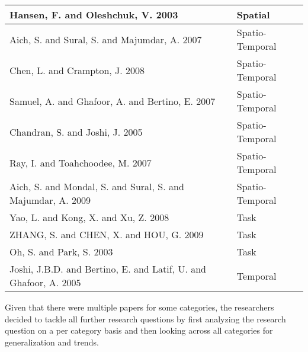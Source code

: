 \begin{center}
\begin{tabular}{|p{10cm}|p{3cm}|}
Hansen, F. and Oleshchuk, V. 2003 \cite{hansen2003spatial} & Spatial \\\hline
Aich, S. and Sural, S. and Majumdar, A. 2007 \cite{aich07:STARBAC} & Spatio-Temporal \\\hline
Chen, L. and Crampton, J. 2008 \cite{chen08:spatio-temporal} & Spatio-Temporal \\\hline
Samuel, A. and Ghafoor, A. and Bertino, E. 2007 \cite{samuel07:spatio-temporal} & Spatio-Temporal \\\hline
Chandran, S. and Joshi, J. 2005 \cite{chandran05:llt} & Spatio-Temporal \\\hline
Ray, I. and Toahchoodee, M. 2007 \cite{ray07:spatio} & Spatio-Temporal \\\hline
Aich, S. and Mondal, S. and Sural, S. and Majumdar, A. 2009 \cite{aich09:role} & Spatio-Temporal \\\hline
Yao, L. and Kong, X. and Xu, Z. 2008 \cite{yao2008task} & Task \\\hline
ZHANG, S. and CHEN, X. and HOU, G. 2009 \cite{zhou2007team} & Task \\\hline
Oh, S. and Park, S. 2003 \cite{oh2003task} & Task \\\hline
Joshi, J.B.D. and Bertino, E. and Latif, U. and Ghafoor, A. 2005 \cite{joshi05:generalized} & Temporal \\\hline
\end{tabular}
\end{center}

Given that there were multiple papers for some categories, the researchers decided to tackle all further research questions by first analyzing the research question on a per category basis and then looking across all categories for generalization and trends.
